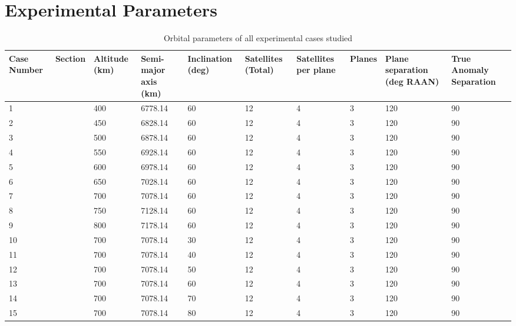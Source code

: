 \chapter{Experimental Parameters}
\label{app:all_parameters}
\begin{table}[H]
	\tiny
  \centering
  \caption{Orbital parameters of all experimental cases studied}
    \begin{tabular}{p{1cm}lp{1cm}p{12mm}p{10mm}p{10mm}p{1cm}lp{1cm}p{1cm}}
    \toprule
    Case Number & Section & Altitude (km) & Semi-major axis (km) & Inclination (deg) & Satellites (Total) &Satellites per plane & Planes & Plane separation (deg RAAN) & True Anomaly Separation \\
    \midrule
    1     &       & 400   & 6778.14 & 60    & 12    & 4     & 3     & 120   & 90 \\
    2     &       & 450   & 6828.14 & 60    & 12    & 4     & 3     & 120   & 90 \\
    3     &       & 500   & 6878.14 & 60    & 12    & 4     & 3     & 120   & 90 \\
    4     &       & 550   & 6928.14 & 60    & 12    & 4     & 3     & 120   & 90 \\
    5     &       & 600   & 6978.14 & 60    & 12    & 4     & 3     & 120   & 90 \\
    6     &       & 650   & 7028.14 & 60    & 12    & 4     & 3     & 120   & 90 \\
    7     &       & 700   & 7078.14 & 60    & 12    & 4     & 3     & 120   & 90 \\
    8     &       & 750   & 7128.14 & 60    & 12    & 4     & 3     & 120   & 90 \\
    9     &       & 800   & 7178.14 & 60    & 12    & 4     & 3     & 120   & 90 \\
    10    &       & 700   & 7078.14 & 30    & 12    & 4     & 3     & 120   & 90 \\
    11    &       & 700   & 7078.14 & 40    & 12    & 4     & 3     & 120   & 90 \\
    12    &       & 700   & 7078.14 & 50    & 12    & 4     & 3     & 120   & 90 \\
    13    &       & 700   & 7078.14 & 60    & 12    & 4     & 3     & 120   & 90 \\
    14    &       & 700   & 7078.14 & 70    & 12    & 4     & 3     & 120   & 90 \\
    15    &       & 700   & 7078.14 & 80    & 12    & 4     & 3     & 120   & 90 \\

\end{tabular}
\end{table}

